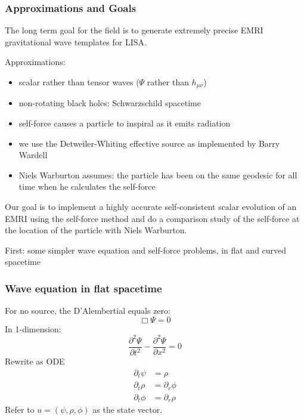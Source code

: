 \documentclass{beamer}
\begin{document}
\begin{frame}
  \frametitle{Approximations and Goals}
  The long term goal for the field is to generate extremely precise EMRI gravitational wave templates for LISA.

  Approximations:
  \begin{itemize}
  \item scalar rather than tensor waves ($\Psi$ rather than $h_{\mu\nu}$)
  \item non-rotating black holes: Schwarzschild spacetime
  \item self-force causes a particle to inspiral as it emits radiation
  \item we use the Detweiler-Whiting effective source as implemented by Barry Wardell
  \item Niels Warburton assumes: the particle has been on the same geodesic for all time when he calculates the self-force
  \end{itemize}
  
  Our goal is to implement a highly accurate self-consistent scalar evolution of an EMRI using the self-force method and do a comparison study of the self-force at the location of the particle with Niels Warburton.

  First: some simpler wave equation and self-force problems, in flat and curved spacetime
  
\end{frame}

\begin{frame}
  \frametitle{Wave equation in flat spacetime}
  For no source, the D'Alembertial equals zero:
  \begin{equation}
    \Box\Psi=0
  \end{equation}
  In 1-dimension:
  \begin{equation}
    \frac{\partial^2\Psi}{\partial t^2}-\frac{\partial^2\Psi}{\partial x^2}=0
  \end{equation}
  Rewrite as ODE
  \begin{eqnarray}
    \partial_t \psi &= \rho\nonumber\\
    \partial_t \rho &= \partial_r \phi\nonumber\\
    \partial_t \phi &= \partial_r \rho
  \end{eqnarray}
  Refer to $u=(\psi,\rho,\phi)$ as the state vector.
\end{frame}
\end{document}
